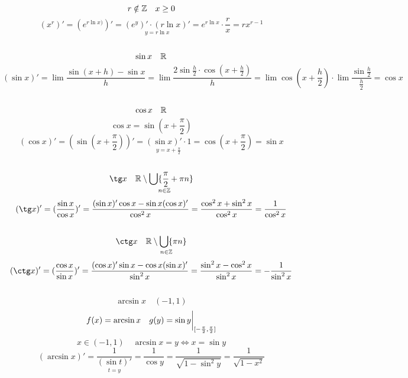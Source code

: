 \subsection{}
$$ r \notin \mathbb{Z} \quad x \ge 0$$
$$ (x^r)' = (e^{r \ln x)})' = \underset{y = r \ln x}{(e^y)' \cdot (r\ln x)'} = e^{r \ln x} \cdot \frac{r}x = rx^{r - 1}$$

\subsection{}
$$ \sin x \quad \mathbb{R}$$
$$ (\sin x)' = \lim \frac{\sin (x + h) - \sin x}h = \lim \frac{2\sin \frac{h}2 \cdot \cos (x + \frac{h}2)}h = \lim \cos (x + \frac{h}2) \cdot \lim \frac{\sin\frac{h}2}{\frac{h}2} = \cos x$$

\subsection{}
$$ \cos x \quad \mathbb{R}$$
$$ \cos x = \sin (x + \frac{\pi}2)$$
$$ (\cos x)' = (\sin (x + \frac{\pi}2))' = \underset{y = x + \frac{\pi}2}{(\sin x)' \cdot 1} = \cos (x + \frac{\pi}2) = \sin x$$


\subsection{}

$$ \tg x \quad \underset{n \in \Z}{\R \setminus \bigcup \{ \frac{\pi}2 + \pi n \}}$$
$$ (\tg x)' = (\frac{\sin x}{\cos x})' = \frac{(\sin x)' \cos x - \sin x (\cos x)'}{\cos^2 x} = \frac{\cos^2 x + \sin^2 x}{\cos^2 x} = \frac1{\cos^2 x}$$

\subsection{}
$$ \ctg x \quad \underset{n \in \Z}{\R \setminus \bigcup \{\pi n \}}$$
$$ (\ctg x)' = (\frac{\cos x}{\sin x})' = \frac{(\cos x)' \sin x - \cos x (\sin x)'}{\sin^2 x} = \frac{\sin^2 x - \cos^2 x}{\sin^2 x} = - \frac1{\sin^2 x}$$

\subsection{}
$$ \arcsin x \quad (-1, 1)$$
$$ f(x) = \arcsin x \quad g(y) = \sin y \bigg|_{[-\frac{\pi}2, \frac{\pi}2]}^{}$$
$$ x \in (-1,1) \quad \arcsin x = y \iff x = \sin y$$
$$ (\arcsin x)' = \underset{t = y}{\frac1{(\sin t)'}} = \frac1{\cos y} = \frac1{\sqrt{1 - \sin^2 y}} = \frac1{\sqrt{1 - x^2}}$$


